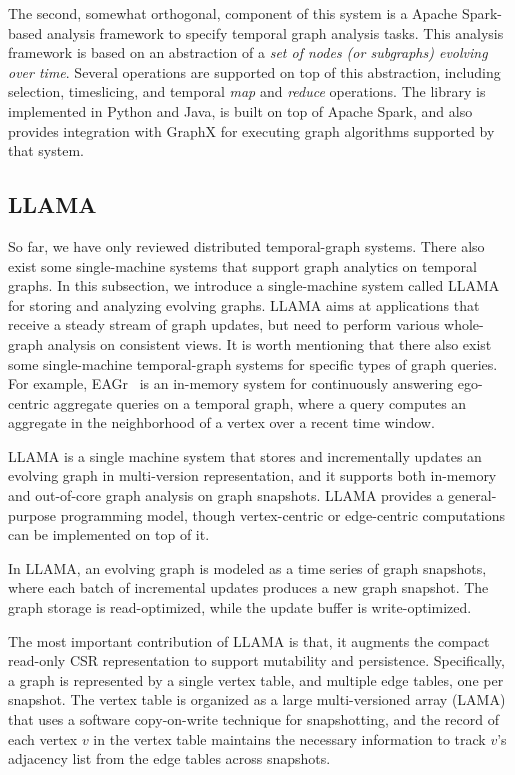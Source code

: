 \documentclass{svjour3}
\begin{document}
\vspace{2mm}
 The second, somewhat orthogonal, component of this system is a Apache Spark-based analysis
framework to specify temporal graph analysis tasks. This analysis framework is based on an abstraction of a \textit{set of nodes 
(or subgraphs) evolving over time}. Several operations are supported on top of this abstraction, including selection, timeslicing, and
temporal {\em map} and {\em reduce} operations. The library is implemented in Python and Java, is built on top of Apache Spark, and also provides
integration with GraphX for executing graph algorithms supported by that system.

\subsection{LLAMA}
So far, we have only reviewed distributed temporal-graph systems. There also exist some single-machine systems that support graph analytics on temporal graphs. In this subsection, we introduce a single-machine system called LLAMA~\cite{llama} for storing and analyzing evolving graphs. LLAMA aims at applications that receive a steady stream of graph updates, but need to perform various whole-graph analysis on consistent views. It is worth mentioning that there also exist some single-machine temporal-graph systems for specific types of graph queries. For example, EAGr~\cite{eagr} is an in-memory system for continuously answering ego-centric aggregate queries on a temporal graph, where a query computes an aggregate in the neighborhood of a vertex over a recent time window.

LLAMA is a single machine system that stores and incrementally updates an evolving graph in multi-version representation, and it supports both in-memory and out-of-core graph analysis on graph snapshots. LLAMA provides a general-purpose programming model, though vertex-centric or edge-centric computations can be implemented on top of it.

In LLAMA, an evolving graph is modeled as a time series of graph snapshots, where each batch of incremental updates produces a new graph snapshot. The graph storage is read-optimized, while the update buffer is write-optimized.

The most important contribution of LLAMA is that, it augments the compact read-only CSR representation to support mutability and persistence. Specifically, a graph is represented by a single vertex table, and multiple edge tables, one per snapshot. The vertex table is organized as a large multi-versioned array (LAMA) that uses a software copy-on-write technique for snapshotting, and the record of each vertex $v$ in the vertex table maintains the necessary information to track $v$'s adjacency list from the edge tables across snapshots.
\end{document}
